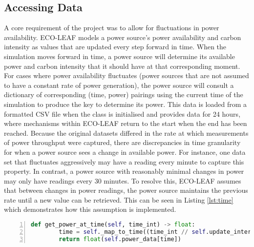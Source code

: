 \documentclass{l4proj}
\begin{document}
\subsection{Accessing Data}\label{imp:subsec:daa}
A core requirement of the project was to allow for fluctuations in power availability. ECO-LEAF models a power source's power availability and carbon intensity as values that are updated every step forward in time.
When the simulation moves forward in time, a power source will determine its available power and carbon intensity that it should have at that corresponding moment.
For cases where power availability fluctuates (power sources that are not assumed to have a constant rate of power generation), the power source will consult a dictionary of corresponding (time, power) pairings using the current time of the simulation to produce the key to determine its power.
This data is loaded from a formatted CSV file when the class is initialised and provides data for 24 hours, where mechanisms within ECO-LEAF return to the start when the end has been reached.
Because the original datasets differed in the rate at which measurements of power throughput were captured, there are discrepancies in time granularity for when a power source sees a change in available power.
For instance, one data set that fluctuates aggressively may have a reading every minute to capture this property.
In contrast, a power source with reasonably minimal changes in power may only have readings every 30 minutes.
To resolve this, ECO-LEAF assumes that between changes in power readings, the power source maintains the previous rate until a new value can be retrieved.
This can be seen in Listing \ref{lst:time} which demonstrates how this assumption is implemented.\\

\begin{lstlisting}[language=python, numbers=left, caption={Example use of how a power source accesses it's available power.}, label=lst:time]
    def get_power_at_time(self, time_int) -> float:
        time = self._map_to_time((time_int // self.update_interval) % len(self.power_data))
        return float(self.power_data[time])
\end{lstlisting}
\end{document}

